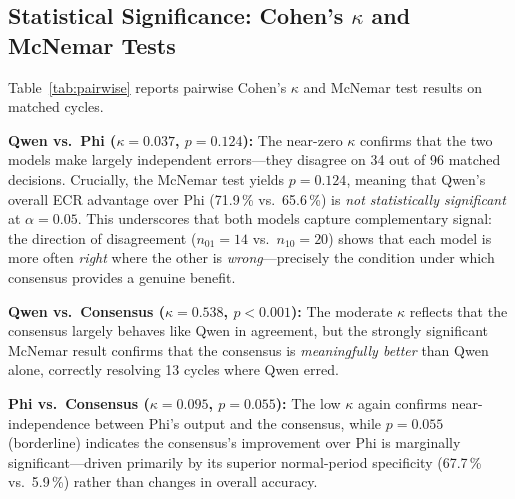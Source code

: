 \documentclass[conference, 10pt]{IEEEtran}
\begin{document}
\subsection{Statistical Significance: Cohen's \texorpdfstring{$\kappa$}{k} and McNemar Tests}
\label{sec:stats}

Table~\ref{tab:pairwise} reports pairwise Cohen's $\kappa$ and McNemar test results on matched cycles.

\begin{table}[ht]
\centering
\caption{Pairwise Statistical Comparison}
\label{tab:pairwise}
\end{table}

\noindent\textbf{Qwen vs.\ Phi ($\kappa = 0.037$, $p = 0.124$):} The near-zero $\kappa$ confirms that the two models make largely independent errors---they disagree on 34 out of 96 matched decisions. Crucially, the McNemar test yields $p = 0.124$, meaning that Qwen's overall ECR advantage over Phi (71.9\,\% vs.\ 65.6\,\%) is \emph{not statistically significant} at $\alpha = 0.05$. This underscores that both models capture complementary signal: the direction of disagreement ($n_{01} = 14$ vs.\ $n_{10} = 20$) shows that each model is more often \emph{right} where the other is \emph{wrong}---precisely the condition under which consensus provides a genuine benefit.

\noindent\textbf{Qwen vs.\ Consensus ($\kappa = 0.538$, $p < 0.001$):} The moderate $\kappa$ reflects that the consensus largely behaves like Qwen in agreement, but the strongly significant McNemar result confirms that the consensus is \emph{meaningfully better} than Qwen alone, correctly resolving 13 cycles where Qwen erred.

\noindent\textbf{Phi vs.\ Consensus ($\kappa = 0.095$, $p = 0.055$):} The low $\kappa$ again confirms near-independence between Phi's output and the consensus, while $p = 0.055$ (borderline) indicates the consensus's improvement over Phi is marginally significant---driven primarily by its superior normal-period specificity (67.7\,\% vs.\ 5.9\,\%) rather than changes in overall accuracy.
\end{document}
